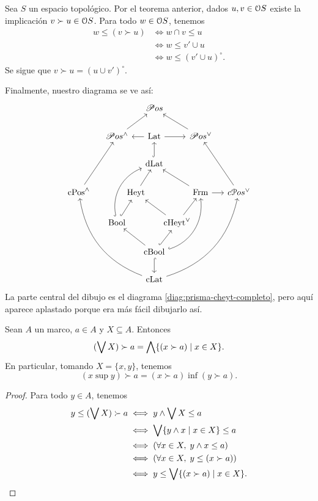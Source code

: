 \begin{exa}
  Sea $S$ un espacio topológico.
  Por el teorema anterior, dados $u,v\in\cal OS$
  existe la implicación $v\succ u\in \cal OS$.
  Para todo $w\in\cal OS$, tenemos
  \begin{align*}
    w\leq (v\succ u)
    &\iff w\cap v\leq u \\
    &\iff w\leq v'\cup u \\
    &\iff w\leq (v'\cup u)^\circ.
  \end{align*}
  Se sigue que $v\succ u = (u\cup v')^\circ$.
\end{exa}

Finalmente, nuestro diagrama se ve así:
\[
  \begin{tikzcd}[column sep = -1em]
      &[2em] & & \Pos & & &[2em] \\
      & \Pos^\wedge \ar[rru]
        && \Lat \ar[ll] \ar[rr]
        && \Pos^\sup  \ar[llu] & \\
      & & & \DLat \ar[u,hook] & & & \\
        \InfLat \ar[ruu]
        && \Heyt \ar[ur]
        &&& \Frm \ar[r] \ar[llu]
        & \SupLat \ar[luu] \\
      & \Bool \ar[rruu,hook,bend left=40] \ar[ur,hook]
      & & & \cHeyt \ar[ur] \ar[llu] & & \\
      & & & \CBA \ar[d,hook] \ar[ull] \ar[ur,hook]
                \ar[uurr,hook,bend right=40]
      & & & \\
      & & & \CLat \ar[rrruuu,bend right]
                  \ar[llluuu,bend left] & &
  \end{tikzcd}
\]
La parte central del dibujo es el diagrama
\eqref{diag:prisma-cheyt-completo}, pero aquí aparece aplastado porque
era más fácil dibujarlo así.

\begin{lemma}
    Sean $A$ un marco, $a\in A$ y $X\subseteq A$.
    Entonces
    \[
        (\Sup X)\succ a = \Inf\{(x\succ a) \mid x\in X\}
    .\]
    En particular, tomando $X=\{x,y\}$, tenemos
    \[
        (x\sup y)\succ a = (x\succ a)\inf(y\succ a)
    .\]
\end{lemma}
\begin{proof}
    Para todo $y\in A$, tenemos
    \begin{align*}
        y\leq (\Sup X)\succ a
        &\iff y\inf \Sup X \leq a \\
        &\iff \Sup\{y\inf x\mid x\in X\} \leq a \\
        &\iff (\forall x\in X,\; y\inf x\leq a) \\
        &\iff (\forall x\in X,\; y\leq(x\succ a)) \\
        &\iff y\leq \Sup\{(x\succ a)\mid x\in X\}.
    \end{align*}
\end{proof}

